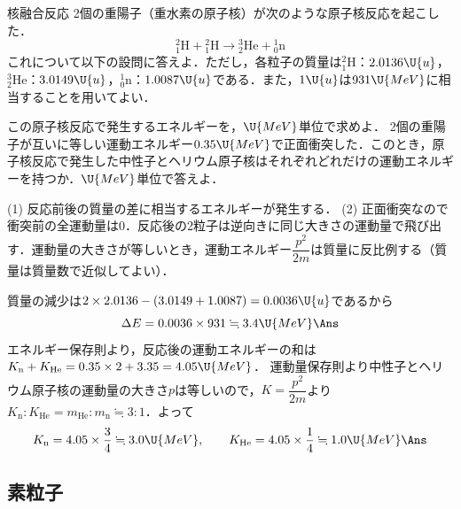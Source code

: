 \bsNeed{56mm}
\begin{reidaiunit}
\begin{reidai}{核融合反応}
\hspace{1zw}2個の重陽子（重水素の原子核）が次のような原子核反応を起こした．
\[{}^2_1\mathrm{H}+{}^2_1\mathrm{H}\to{}^3_2\mathrm{He}+{}^1_0\mathrm{n}\]
これについて以下の設問に答えよ．ただし，各粒子の質量は${}^2_1\mathrm{H}$：$2.0136\U{u}$，${}^3_2\mathrm{He}$：$3.0149\U{u}$，${}^1_0\mathrm{n}$：$1.0087\U{u}$である．また，$1\U{u}$は$931\U{MeV}$に相当することを用いてよい．
\begin{komon}
 この原子核反応で発生するエネルギーを，$\U{MeV}$単位で求めよ．
 2個の重陽子が互いに等しい運動エネルギー$0.35\U{MeV}$で正面衝突した．このとき，原子核反応で発生した中性子とヘリウム原子核はそれぞれどれだけの運動エネルギーを持つか．$\U{MeV}$単位で答えよ．
\end{komon}
\end{reidai}

\begin{sisinE}
(1) 反応前後の質量の差に相当するエネルギーが発生する．
(2) 正面衝突なので衝突前の全運動量は$0$．反応後の2粒子は逆向きに同じ大きさの運動量で飛び出す．運動量の大きさが等しいとき，運動エネルギー$\dfrac{p^2}{2m}$は質量に反比例する（質量は質量数で近似してよい）．
\end{sisinE}


\begin{kaitou}
\begin{komon}
 質量の減少は$2\times 2.0136-(3.0149+1.0087)=0.0036\U{u}$であるから
       \[\Delta E=0.0036\times 931\fallingdotseq 3.4\U{MeV}\Ans\]
 エネルギー保存則より，反応後の運動エネルギーの和は$K_{\mathrm{n}}+K_{\mathrm{He}}=0.35\times 2+3.35=4.05\U{MeV}$．
       運動量保存則より中性子とヘリウム原子核の運動量の大きさ$p$は等しいので，$K=\dfrac{p^2}{2m}$より$K_{\mathrm{n}}:K_{\mathrm{He}}=m_{\mathrm{He}}:m_{\mathrm{n}}\fallingdotseq 3:1$．よって
       \[K_{\mathrm{n}}=4.05\times\frac{3}{4}\fallingdotseq 3.0\U{MeV},\qquad K_{\mathrm{He}}=4.05\times\frac{1}{4}\fallingdotseq 1.0\U{MeV}\Ans\]
\end{komon}
\end{kaitou}
\end{reidaiunit}

\subsection{素粒子}

